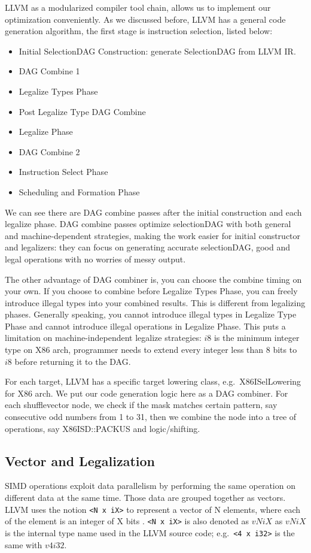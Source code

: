 LLVM as a modularized compiler tool chain, allows us to implement our optimization conveniently. As we discussed before, LLVM has a general code generation algorithm, the first stage is instruction selection, listed below\cite{llvm_code_gen}:

\begin{itemize}
  \item Initial SelectionDAG Construction: generate SelectionDAG from LLVM IR.
  \item DAG Combine 1
  \item Legalize Types Phase
  \item Post Legalize Type DAG Combine
  \item Legalize Phase
  \item DAG Combine 2
  \item Instruction Select Phase
  \item Scheduling and Formation Phase
\end{itemize}

We can see there are DAG combine passes after the initial construction and each legalize phase\cite{llvm_code_gen}. DAG combine passes optimize selectionDAG with both general and machine-dependent strategies, making the work easier for initial constructor and legalizers: they can focus on generating accurate selectionDAG, good and legal operations with no worries of messy output.

The other advantage of DAG combiner is, you can choose the combine timing on your own. If you choose to combine before Legalize Types Phase, you can freely introduce illegal types into your combined results. This is different from legalizing phases. Generally speaking, you cannot introduce illegal types in Legalize Type Phase and cannot introduce illegal operations in Legalize Phase. This puts a limitation on machine-independent legalize strategies: $i8$ is the minimum integer type on X86 arch, programmer needs to extend every integer less than 8 bits to $i8$ before returning it to the DAG.

For each target, LLVM has a specific target lowering class, e.g.\ X86ISelLowering for X86 arch. We put our code generation logic here as a DAG combiner. For each shufflevector node, we check if the mask matches certain pattern, say consecutive odd numbers from 1 to 31, then we combine the node into a tree of operations, say X86ISD::PACKUS and logic/shifting.

\subsection{Vector and Legalization}
SIMD operations exploit data parallelism by performing the same operation on different data at the same time. Those data are grouped together as vectors. LLVM uses the notion \verb|<N x iX>| to represent a vector of N elements, where each of the element is an integer of X bits \cite{llvm_lang_ref, hybrid_simd_type_legalize}. \verb|<N x iX>| is also denoted as $vNiX$ as $vNiX$ is the internal type name used in the LLVM source code; e.g.\ \verb|<4 x i32>| is the same with $v4i32$.

